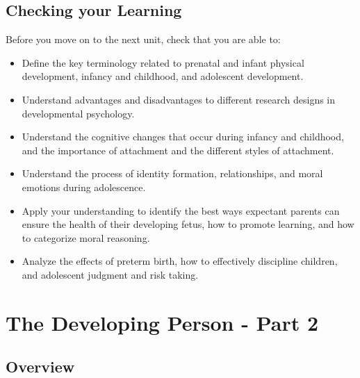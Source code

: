 \documentclass[
]{book}
\providecommand{\tightlist}{%
  \setlength{\itemsep}{0pt}\setlength{\parskip}{0pt}}
\begin{document}
\hypertarget{checking-your-learning-2}{%
\section*{Checking your Learning}\label{checking-your-learning-2}}

\begin{progress}
Before you move on to the next unit, check that you are able to:

\begin{itemize}
\tightlist
\item
  Define the key terminology related to prenatal and infant physical development, infancy and childhood, and adolescent development.\\
\item
  Understand advantages and disadvantages to different research designs in developmental psychology.\\
\item
  Understand the cognitive changes that occur during infancy and childhood, and the importance of attachment and the different styles of attachment.\\
\item
  Understand the process of identity formation, relationships, and moral emotions during adolescence.\\
\item
  Apply your understanding to identify the best ways expectant parents can ensure the health of their developing fetus, how to promote learning, and how to categorize moral reasoning.\\
\item
  Analyze the effects of preterm birth, how to effectively discipline children, and adolescent judgment and risk taking.
\end{itemize}
\end{progress}

\hypertarget{the-developing-person---part-2}{%
\chapter{The Developing Person - Part 2}\label{the-developing-person---part-2}}

\hypertarget{overview-3}{%
\section*{Overview}\label{overview-3}}
\end{document}
